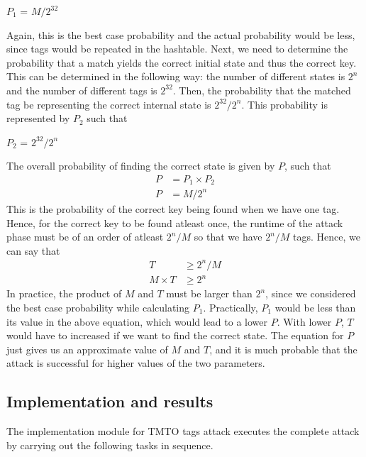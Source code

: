 \begin{center}
$P_1$ = $M/2^{32}$
\end{center}

Again, this is the best case probability and the actual probability would be less, since tags would be repeated in the hashtable. Next, we need to determine the probability that a match yields the correct initial state and thus the correct key. This can be determined in the following way: the number of different states is $2^n$ and the number of different tags is $2^{32}$. Then, the probability that the matched tag be representing the correct internal state is $2^{32}/2^n$. This probability is represented by $P_2$ such that
\begin{center}
$P_2$ = $2^{32}/2^n$
\end{center}
The overall probability of finding the correct state is given by $P$, such that
\begin{align*}
P &= P_1 \times P_2\\
P &= M/2^{n}
\end{align*}
This is the probability of the correct key being found when we have one tag. Hence, for the correct key to be found atleast once, the runtime of the attack phase must be of an order of atleast $2^{n}/M$ so that we have $2^{n}/M$ tags. Hence, we can say that
\begin{align*}
T &\geq 2^{n}/M\\
M \times T &\geq 2^{n}
\end{align*}
In practice, the product of $M$ and $T$ must be larger than $2^n$, since we considered the best case probability while calculating $P_1$. Practically, $P_1$ would be less than its value in the above equation, which would lead to a lower $P$. With lower $P$, $T$ would have to increased if we want to find the correct state. The equation for $P$ just gives us an approximate value of $M$ and $T$, and it is much probable that the attack is successful for higher values of the two parameters.

\subsection{Implementation and results}

The implementation module for TMTO tags attack executes the complete attack by carrying out the following tasks in sequence. 

